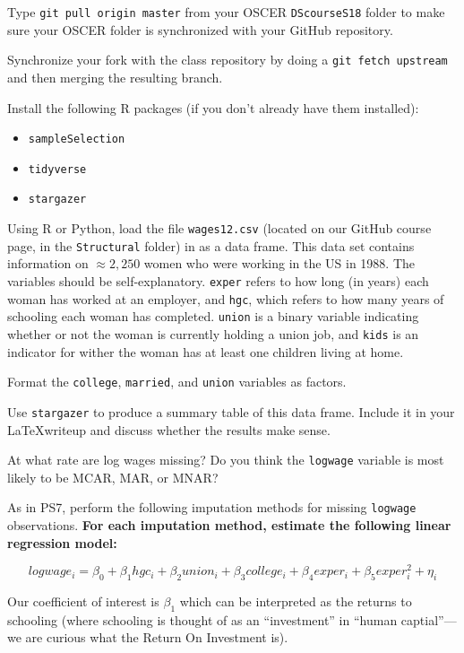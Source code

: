 \documentclass[12pt,english]{exam}
\begin{document}
\begin{questions}
\question Type \texttt{git pull origin master} from your OSCER \texttt{DScourseS18} folder to make sure your OSCER folder is synchronized with your GitHub repository. 

\question Synchronize your fork with the class repository by doing a \texttt{git fetch upstream} and then merging the resulting branch. 

\question Install the following R packages (if you don't already have them installed):
\begin{itemize}
    \item \texttt{sampleSelection}
    \item \texttt{tidyverse}
    \item \texttt{stargazer}
\end{itemize}

\question Using R or Python, load the file \texttt{wages12.csv} (located on our GitHub course page, in the \texttt{Structural} folder) in as a data frame. This data set contains information on $\approx 2,250$ women who were working in the US in 1988. The variables should be self-explanatory. \texttt{exper} refers to how long (in years) each woman has worked at an employer, and \texttt{hgc}, which refers to how many years of schooling each woman has completed. \texttt{union} is a binary variable indicating whether or not the woman is currently holding a union job, and \texttt{kids} is an indicator for wither the woman has at least one children living at home.

\question Format the \texttt{college}, \texttt{married}, and \texttt{union} variables as factors.

\question Use \texttt{stargazer} to produce a summary table of this data frame. Include it in your \LaTeX writeup and discuss whether the results make sense.

At what rate are log wages missing? Do you think the \texttt{logwage} variable is most likely to be MCAR, MAR, or MNAR?

\question As in PS7, perform the following imputation methods for missing \texttt{logwage} observations. \textbf{For each imputation method, estimate the following linear regression model:}

\[
    logwage_{i} = \beta_{0} +  \beta_{1}hgc_{i} + \beta_{2}union_{i} + \beta_{3}college_{i} + \beta_{4}exper_{i} + \beta_{5}exper^{2}_{i} + \eta_{i}
\]

Our coefficient of interest is $\beta_{1}$ which can be interpreted as the returns to schooling (where schooling is thought of as an ``investment'' in ``human captial''---we are curious what the Return On Investment is).


\end{questions}
\end{document}
